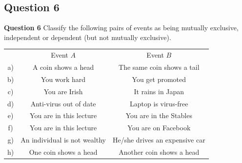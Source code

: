 \documentclass[compress]{beamer}        %
\makeatletter
\newcommand{\tcb}{\textcolor{beamer@blendedblue}}
\makeatother
\begin{document}
\subsection{Question 6}
\begin{frame}{\bf \tcb{Question 6}}
Classify the following pairs of events as being mutually exclusive, independent or dependent (but not mutually exclusive).\\[0.4cm]

\begin{tabular}{ccc}
         & Event $A$ & Event $B$ \\[0.2cm]
\tcb{a)} &  A coin shows a head   & The same coin shows a tail \\[0.2cm]
\tcb{b)} &  You work hard   & You get promoted \\[0.2cm]
\tcb{c)} &  You are Irish  & It rains in Japan \\[0.2cm]
\tcb{d)} &  Anti-virus out of date  & Laptop is virus-free \\[0.2cm]
\tcb{e)} &  You are in this lecture   & You are in the Stables \\[0.2cm]
\tcb{f)} &  You are in this lecture   & You are on Facebook \\[0.2cm]
\tcb{g)} &  An individual is not wealthy   & He/she drives an expensive car  \\[0.2cm]
\tcb{h)} &  One coin shows a head   & Another coin shows a head
\end{tabular}


\end{frame}
\end{document}
